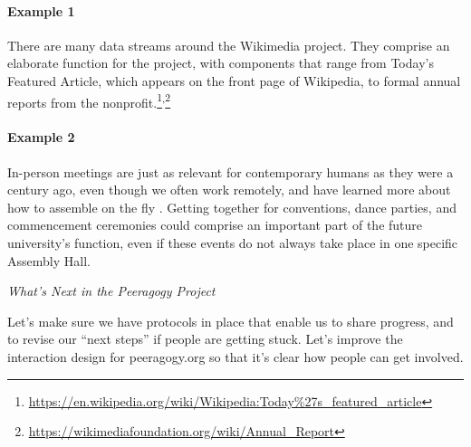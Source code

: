 \begin{refsection}
\paragraph{Example 1} 
There are many data streams around the Wikimedia project.  They comprise an elaborate  function for the project, with components that range from Today's Featured Article, which appears on the front page of Wikipedia, to formal annual reports from the nonprofit.\footnote{\url{https://en.wikipedia.org/wiki/Wikipedia:Today\%27s_featured_article}}\textsuperscript{,}\footnote{\url{https://wikimediafoundation.org/wiki/Annual_Report}}


\paragraph{Example 2} In-person meetings are just as relevant for contemporary humans as they were a century ago, even though we often work remotely, and have learned more about how to assemble on the fly \cite{rheingold2007smart}.  Getting together for conventions, dance parties, and commencement ceremonies could comprise an important part of the future university's  function, even if these events do not always take place in one specific Assembly Hall.



\FloatBarrier

\begin{framed}
\noindent 
\emph{What's Next in the Peeragogy Project}
\begin{collectinmacro}{\WrapperWN}{}{}
Let's make sure we have protocols in place that enable us to share
progress, and to revise our ``next steps'' if people are getting
stuck.  Let's improve the interaction design for peeragogy.org so that
it's clear how people can get involved.
\end{collectinmacro}
\WrapperWN
\end{framed}    

\printbibliography[heading=subbibliography]
\end{refsection}


